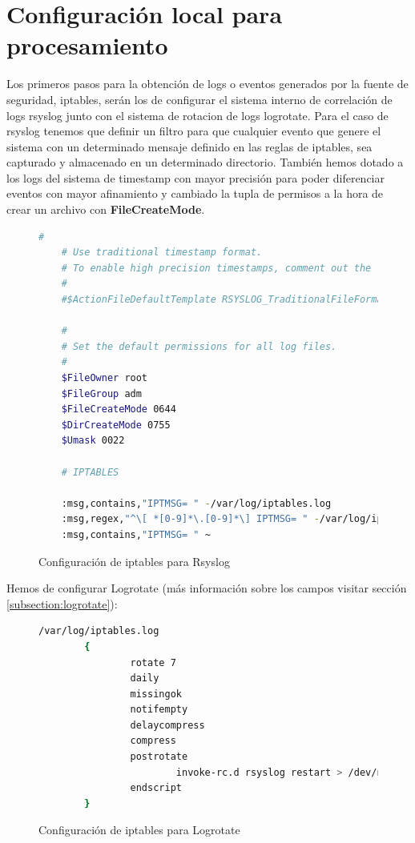 \section[Configuración local]{Configuración local para procesamiento}
Los primeros pasos para la obtención de logs o eventos generados por la fuente de seguridad, iptables, serán los de configurar el sistema interno de correlación de logs rsyslog junto con el sistema de rotacion de logs logrotate. Para el caso de rsyslog tenemos que definir un filtro para que cualquier evento que genere el sistema con un determinado mensaje definido en las reglas de iptables, sea capturado y almacenado en un determinado directorio. También hemos dotado a los logs del sistema de timestamp con mayor precisión para poder diferenciar eventos con mayor afinamiento y cambiado la tupla de permisos a la hora de crear un archivo con \textbf{FileCreateMode}.

\begin{figure}[H]
  \begin{lstlisting}[language=bash]
    #
    # Use traditional timestamp format.
    # To enable high precision timestamps, comment out the following line.
    #
    #$ActionFileDefaultTemplate RSYSLOG_TraditionalFileFormat

    #
    # Set the default permissions for all log files.
    #
    $FileOwner root
    $FileGroup adm
    $FileCreateMode 0644
    $DirCreateMode 0755
    $Umask 0022

    # IPTABLES

    :msg,contains,"IPTMSG= " -/var/log/iptables.log
    :msg,regex,"^\[ *[0-9]*\.[0-9]*\] IPTMSG= " -/var/log/iptables.log
    :msg,contains,"IPTMSG= " ~

  \end{lstlisting}
  \caption{Configuración de iptables para Rsyslog}
\end{figure}
\pagebreak
Hemos de configurar Logrotate (más información sobre los campos visitar sección \ref{subsection:logrotate}):

\begin{figure}[H]
\begin{lstlisting}[language=bash]
/var/log/iptables.log
        {
                rotate 7
                daily
                missingok
                notifempty
                delaycompress
                compress
                postrotate
                        invoke-rc.d rsyslog restart > /dev/null
                endscript
        }
\end{lstlisting}
\caption{Configuración de iptables para Logrotate}
\end{figure}

